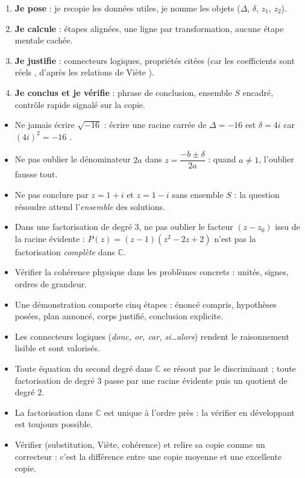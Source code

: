 \documentclass[11pt]{article}
\begin{document}
\begin{methode}
\begin{enumerate}
\item \textbf{Je pose} : je recopie les données utiles, je nomme les objets ($\Delta$, $\delta$, $z_1$, $z_2$).
\item \textbf{Je calcule} : étapes alignées, une ligne par transformation, aucune étape mentale cachée.
\item \textbf{Je justifie} : connecteurs logiques, propriétés citées (\og car les coefficients sont réels \fg, \og d'après les relations de Viète \fg).
\item \textbf{Je conclus et je vérifie} : phrase de conclusion, ensemble $S$ encadré, contrôle rapide signalé sur la copie.
\end{enumerate}
\end{methode}

\begin{attention}
\begin{itemize}
\item Ne jamais écrire $\sqrt{-16}$ : écrire \og une racine carrée de $\Delta=-16$ est $\delta=4i$ car $(4i)^2=-16$ \fg.
\item Ne pas oublier le dénominateur $2a$ dans $z=\dfrac{-b\pm\delta}{2a}$ : quand $a\neq 1$, l'oublier fausse tout.
\item Ne pas conclure par \og $z=1+i$ et $z=1-i$ \fg sans ensemble $S$ : la question \og résoudre \fg attend l'\emph{ensemble} des solutions.
\item Dans une factorisation de degré 3, ne pas oublier le facteur $(z-z_0)$ issu de la racine évidente : $P(z)=(z-1)(z^2-2z+2)$ n'est pas la factorisation \emph{complète} dans $\mathbb{C}$.
\item Vérifier la cohérence physique dans les problèmes concrets : unités, signes, ordres de grandeur.
\end{itemize}
\end{attention}

\begin{aretenir}
\begin{itemize}
\item Une démonstration comporte cinq étapes : énoncé compris, hypothèses posées, plan annoncé, corps justifié, conclusion explicite.
\item Les connecteurs logiques (\emph{donc, or, car, si\ldots alors}) rendent le raisonnement lisible et sont valorisés.
\item Toute équation du second degré dans $\mathbb{C}$ se résout par le discriminant ; toute factorisation de degré 3 passe par une racine évidente puis un quotient de degré 2.
\item La factorisation dans $\mathbb{C}$ est unique à l'ordre près : la vérifier en développant est toujours possible.
\item Vérifier (substitution, Viète, cohérence) et relire sa copie comme un correcteur : c'est la différence entre une copie moyenne et une excellente copie.
\end{itemize}
\end{aretenir}
\end{document}
